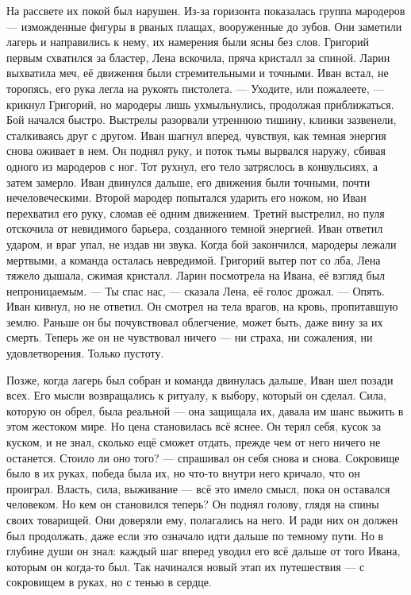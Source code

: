 \documentclass[12pt,a4paper]{book}
\begin{document}
На рассвете их покой был нарушен. Из-за горизонта показалась группа мародеров — изможденные фигуры в рваных плащах, вооруженные до зубов. Они заметили лагерь и направились к нему, их намерения были ясны без слов.
Григорий первым схватился за бластер, Лена вскочила, пряча кристалл за спиной. Ларин выхватила меч, её движения были стремительными и точными. Иван встал, не торопясь, его рука легла на рукоять пистолета.
— Уходите, или пожалеете, — крикнул Григорий, но мародеры лишь ухмыльнулись, продолжая приближаться.
Бой начался быстро. Выстрелы разорвали утреннюю тишину, клинки зазвенели, сталкиваясь друг с другом. Иван шагнул вперед, чувствуя, как темная энергия снова оживает в нем. Он поднял руку, и поток тьмы вырвался наружу, сбивая одного из мародеров с ног. Тот рухнул, его тело затряслось в конвульсиях, а затем замерло.
Иван двинулся дальше, его движения были точными, почти нечеловеческими. Второй мародер попытался ударить его ножом, но Иван перехватил его руку, сломав её одним движением. Третий выстрелил, но пуля отскочила от невидимого барьера, созданного темной энергией. Иван ответил ударом, и враг упал, не издав ни звука.
Когда бой закончился, мародеры лежали мертвыми, а команда осталась невредимой. Григорий вытер пот со лба, Лена тяжело дышала, сжимая кристалл. Ларин посмотрела на Ивана, её взгляд был непроницаемым.
— Ты спас нас, — сказала Лена, её голос дрожал. — Опять.
Иван кивнул, но не ответил. Он смотрел на тела врагов, на кровь, пропитавшую землю. Раньше он бы почувствовал облегчение, может быть, даже вину за их смерть. Теперь же он не чувствовал ничего — ни страха, ни сожаления, ни удовлетворения. Только пустоту.

Позже, когда лагерь был собран и команда двинулась дальше, Иван шел позади всех. Его мысли возвращались к ритуалу, к выбору, который он сделал. Сила, которую он обрел, была реальной — она защищала их, давала им шанс выжить в этом жестоком мире. Но цена становилась всё яснее. Он терял себя, кусок за куском, и не знал, сколько ещё сможет отдать, прежде чем от него ничего не останется.
Стоило ли оно того? — спрашивал он себя снова и снова. Сокровище было в их руках, победа была их, но что-то внутри него кричало, что он проиграл. Власть, сила, выживание — всё это имело смысл, пока он оставался человеком. Но кем он становился теперь?
Он поднял голову, глядя на спины своих товарищей. Они доверяли ему, полагались на него. И ради них он должен был продолжать, даже если это означало идти дальше по темному пути. Но в глубине души он знал: каждый шаг вперед уводил его всё дальше от того Ивана, которым он когда-то был.
Так начинался новый этап их путешествия — с сокровищем в руках, но с тенью в сердце.
\end{document}
